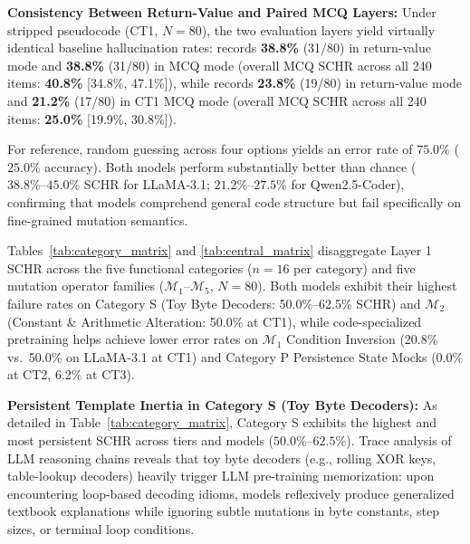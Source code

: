 \documentclass[runningheads]{llncs}
\begin{document}
\textbf{Consistency Between Return-Value and Paired MCQ Layers:} Under stripped pseudocode (CT1, $N=80$), the two evaluation layers yield virtually identical baseline hallucination rates:  records \textbf{38.8\%} (31/80) in return-value mode and \textbf{38.8\%} (31/80) in MCQ mode (overall MCQ SCHR across all 240 items: \textbf{40.8\%} [34.8\%, 47.1\%]), while  records \textbf{23.8\%} (19/80) in return-value mode and \textbf{21.2\%} (17/80) in CT1 MCQ mode (overall MCQ SCHR across all 240 items: \textbf{25.0\%} [19.9\%, 30.8\%]).

For reference, random guessing across four options yields an error rate of $75.0\%$ ($25.0\%$ accuracy). Both models perform substantially better than chance ($38.8\%\text{--}45.0\%$ SCHR for LLaMA-3.1; $21.2\%\text{--}27.5\%$ for Qwen2.5-Coder), confirming that models comprehend general code structure but fail specifically on fine-grained mutation semantics.

Tables~\ref{tab:category_matrix} and \ref{tab:central_matrix} disaggregate Layer 1 SCHR across the five functional categories ($n=16$ per category) and five mutation operator families ($\mathcal{M}_1$--$\mathcal{M}_5$, $N=80$). Both models exhibit their highest failure rates on Category S (Toy Byte Decoders: 50.0\%--62.5\% SCHR) and $\mathcal{M}_2$ (Constant \& Arithmetic Alteration: 50.0\% at CT1), while code-specialized pretraining helps  achieve lower error rates on $\mathcal{M}_1$ Condition Inversion (20.8\% vs.\ 50.0\% on LLaMA-3.1 at CT1) and Category P Persistence State Mocks (0.0\% at CT2, 6.2\% at CT3).

\textbf{Persistent Template Inertia in Category S (Toy Byte Decoders):} As detailed in Table~\ref{tab:category_matrix}, Category S exhibits the highest and most persistent SCHR across tiers and models ($50.0\%\text{--}62.5\%$). Trace analysis of LLM reasoning chains reveals that toy byte decoders (e.g., rolling XOR keys, table-lookup decoders) heavily trigger LLM pre-training memorization: upon encountering loop-based decoding idioms, models reflexively produce generalized textbook explanations while ignoring subtle mutations in byte constants, step sizes, or terminal loop conditions.
\end{document}
